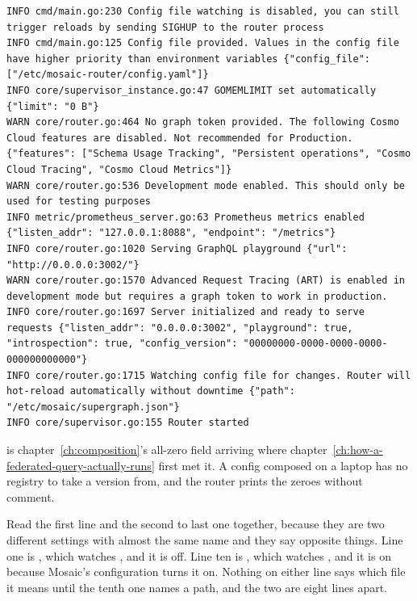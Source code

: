 \begin{verbatim}
INFO cmd/main.go:230 Config file watching is disabled, you can still trigger reloads by sending SIGHUP to the router process
INFO cmd/main.go:125 Config file provided. Values in the config file have higher priority than environment variables {"config_file": ["/etc/mosaic-router/config.yaml"]}
INFO core/supervisor_instance.go:47 GOMEMLIMIT set automatically {"limit": "0 B"}
WARN core/router.go:464 No graph token provided. The following Cosmo Cloud features are disabled. Not recommended for Production. {"features": ["Schema Usage Tracking", "Persistent operations", "Cosmo Cloud Tracing", "Cosmo Cloud Metrics"]}
WARN core/router.go:536 Development mode enabled. This should only be used for testing purposes
INFO metric/prometheus_server.go:63 Prometheus metrics enabled {"listen_addr": "127.0.0.1:8088", "endpoint": "/metrics"}
INFO core/router.go:1020 Serving GraphQL playground {"url": "http://0.0.0.0:3002/"}
WARN core/router.go:1570 Advanced Request Tracing (ART) is enabled in development mode but requires a graph token to work in production.
INFO core/router.go:1697 Server initialized and ready to serve requests {"listen_addr": "0.0.0.0:3002", "playground": true, "introspection": true, "config_version": "00000000-0000-0000-0000-000000000000"}
INFO core/router.go:1715 Watching config file for changes. Router will hot-reload automatically without downtime {"path": "/etc/mosaic/supergraph.json"}
INFO core/supervisor.go:155 Router started
\end{verbatim}

%
 is chapter~\ref{ch:composition}'s all-zero 
field arriving where chapter~\ref{ch:how-a-federated-query-actually-runs} first
met it. A config composed on a laptop has no registry to take a version from,
and the router prints the zeroes without comment.

%
Read the first line and the second to last one together, because they are two
different settings with almost the same name and they say opposite things.
Line one is , which watches , and it is
off. Line ten is , which watches
, and it is on because Mosaic's configuration turns it on.
Nothing on either line says which file it means until the tenth one names a
path, and the two are eight lines apart.

